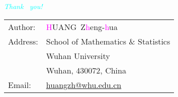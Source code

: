 \documentclass[notheorems,mathserif,table]{beamer}
\begin{document}
\begin{frame}
 \begin{center}
{\huge \emph{\textcolor{cyan}{Thank  ~you!}}}\\
\vspace{5mm}\large
\begin{tabular}{ll}
{\sc Author}:  & \textsf{\textcolor{magenta}{H}UANG\ Z\textcolor{magenta}{h}eng-\textcolor{magenta}{h}ua}\\
{\sc Address}: & School of Mathematics \& Statistics\\
               & Wuhan University  \\
               & Wuhan, 430072, China\\
  {\sc Email}: & \href{mailto:huangzh@whu.edu.cn}{\color{blue}huangzh@whu.edu.cn}\\
\end{tabular}
\end{center}
\end{frame}

\end{document}
